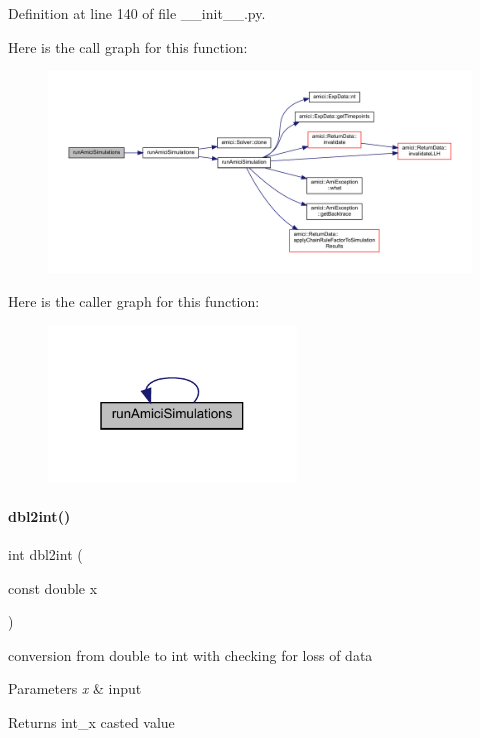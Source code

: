 Definition at line 140 of file \+\_\+\+\_\+init\+\_\+\+\_\+.\+py.

Here is the call graph for this function\+:
\nopagebreak
\begin{figure}[H]
\begin{center}
\leavevmode
\includegraphics[width=350pt]{namespaceamici_a9fcd2221445c4966d12cd57b4b7f688e_cgraph}
\end{center}
\end{figure}
Here is the caller graph for this function\+:
\nopagebreak
\begin{figure}[H]
\begin{center}
\leavevmode
\includegraphics[width=187pt]{namespaceamici_a9fcd2221445c4966d12cd57b4b7f688e_icgraph}
\end{center}
\end{figure}
\mbox{\label{namespaceamici_a204c68962100d0020a37392fef2e95e2}} 
\paragraph{\texorpdfstring{dbl2int()}{dbl2int()}}
{\footnotesize\ttfamily int dbl2int (\begin{DoxyParamCaption}\item[{const double}]{x }\end{DoxyParamCaption})}

conversion from double to int with checking for loss of data 
\begin{DoxyParams}{Parameters}
{\em x} & input \\
\hline
\end{DoxyParams}
\begin{DoxyReturn}{Returns}
int\+\_\+x casted value 
\end{DoxyReturn}


